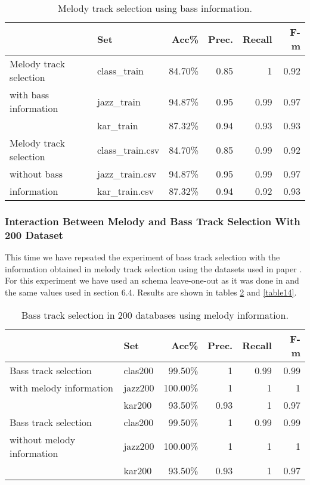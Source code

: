 \documentclass{article}
\begin{document}
\begin{table}
\begin{center}
\begin{tabular}{  l | l | r | r | r | r }
\hline
 & Set & Acc\% & Prec. & Recall & F-m \\
\hline
\hline
Melody track selection  & class\_train & 84.70\% & 0.85 & 1 & 0.92 \\
with bass information & jazz\_train & 94.87\% & 0.95 & 0.99 & 0.97 \\
 & kar\_train & 87.32\% & 0.94 & 0.93 & 0.93 \\
\hline
Melody track selection  & class\_train.csv & 84.70\% & 0.85 & 0.99 & 0.92 \\
without bass  & jazz\_train.csv & 94.87\% & 0.95 & 0.99 & 0.97 \\
information & kar\_train.csv & 87.32\% & 0.94 & 0.92 & 0.93 \\
\hline
\end{tabular}
\caption{Melody track selection using bass information.}
\label{table11}
\end{center}
\end{table}



\subsubsection{Interaction Between Melody and Bass Track Selection With 200 Dataset}

This time we have repeated the experiment of bass track selection with the information obtained in melody track selection using the datasets used in paper \cite{vicente2012bass}. For this experiment we have used an schema leave-one-out as it was done in \cite{vicente2012bass} and the same values used in section 6.4. Results are shown in tables \ref{table13} and \ref{table14}.

\begin{table}
\begin{center}
\begin{tabular}{  l | l | r | r | r | r }
\hline
 & Set & Acc\% & Prec. & Recall & F-m \\
\hline
\hline
Bass track selection  & clas200 & 99.50\% & 1 & 0.99 & 0.99 \\
with melody information & jazz200 & 100.00\% & 1 & 1 & 1 \\
 & kar200 & 93.50\% & 0.93 & 1 & 0.97 \\
\hline
Bass track selection  & clas200 & 99.50\% & 1 & 0.99 & 0.99 \\
without melody information & jazz200 & 100.00\% & 1 & 1 & 1 \\
 & kar200 & 93.50\% & 0.93 & 1 & 0.97 \\
\hline
\end{tabular}
\caption{Bass track selection in 200 databases using melody information.}
\label{table13}
\end{center}
\end{table}
\end{document}
